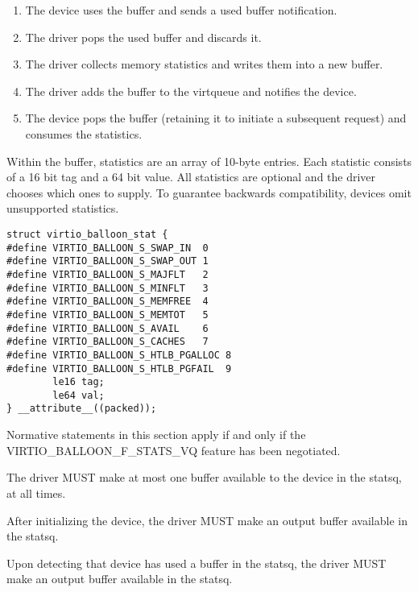 \begin{enumerate}
\item The device uses the buffer and sends a used buffer notification.

\item The driver pops the used buffer and discards it.

\item The driver collects memory statistics and writes them into a
  new buffer.

\item The driver adds the buffer to the virtqueue and notifies the
  device.

\item The device pops the buffer (retaining it to initiate a
  subsequent request) and consumes the statistics.
\end{enumerate}

  Within the buffer, statistics are an array of 10-byte entries.
  Each statistic consists of a 16 bit
  tag and a 64 bit value. All statistics are optional and the
  driver chooses which ones to supply. To guarantee backwards
  compatibility, devices omit unsupported statistics.

\begin{lstlisting}
struct virtio_balloon_stat {
#define VIRTIO_BALLOON_S_SWAP_IN  0
#define VIRTIO_BALLOON_S_SWAP_OUT 1
#define VIRTIO_BALLOON_S_MAJFLT   2
#define VIRTIO_BALLOON_S_MINFLT   3
#define VIRTIO_BALLOON_S_MEMFREE  4
#define VIRTIO_BALLOON_S_MEMTOT   5
#define VIRTIO_BALLOON_S_AVAIL    6
#define VIRTIO_BALLOON_S_CACHES   7
#define VIRTIO_BALLOON_S_HTLB_PGALLOC 8
#define VIRTIO_BALLOON_S_HTLB_PGFAIL  9
        le16 tag;
        le64 val;
} __attribute__((packed));
\end{lstlisting}

Normative statements in this section apply if and only if the
VIRTIO_BALLOON_F_STATS_VQ feature has been negotiated.

The driver MUST make at most one buffer available to the device
in the statsq, at all times.

After initializing the device, the driver MUST make an output
buffer available in the statsq.

Upon detecting that device has used a buffer in the statsq, the
driver MUST make an output buffer available in the statsq.

